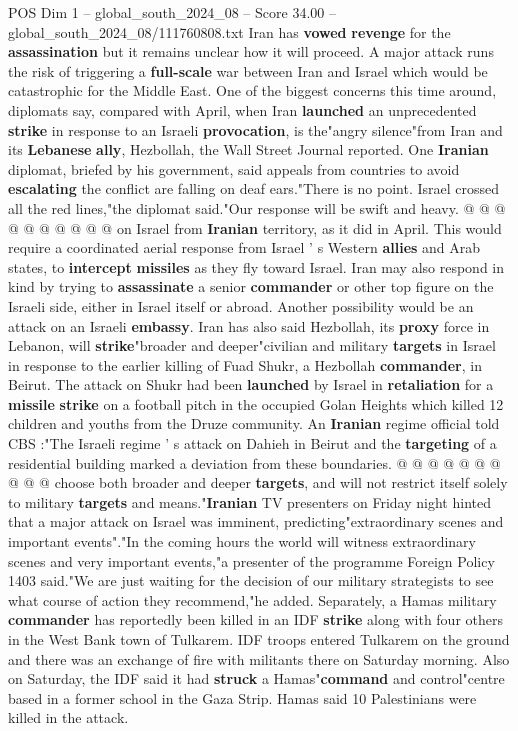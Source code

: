 \begin{textsample}{POS Dim 1 – global\_south\_2024\_08 – Score 34.00 – global\_south\_2024\_08/111760808.txt}
Iran has \textbf{vowed} \textbf{revenge} for the \textbf{assassination} but it remains unclear how it will proceed.
A major attack runs the risk of triggering a \textbf{full-scale} war between Iran and Israel which would be catastrophic for the Middle East.
One of the biggest concerns this time around, diplomats say, compared with April, when Iran \textbf{launched} an unprecedented \textbf{strike} in response to an Israeli \textbf{provocation}, is the"angry silence"from Iran and its \textbf{Lebanese} \textbf{ally}, Hezbollah, the Wall Street Journal reported.
One \textbf{Iranian} diplomat, briefed by his government, said appeals from countries to avoid \textbf{escalating} the conflict are falling on deaf ears."There is no point.
Israel crossed all the red lines,"the diplomat said."Our response will be swift and heavy. @ @ @ @ @ @ @ @ @ @ on Israel from \textbf{Iranian} territory, as it did in April.
This would require a coordinated aerial response from Israel ' s Western \textbf{allies} and Arab states, to \textbf{intercept} \textbf{missiles} as they fly toward Israel.
Iran may also respond in kind by trying to \textbf{assassinate} a senior \textbf{commander} or other top figure on the Israeli side, either in Israel itself or abroad.
Another possibility would be an attack on an Israeli \textbf{embassy}.
Iran has also said Hezbollah, its \textbf{proxy} force in Lebanon, will \textbf{strike}"broader and deeper"civilian and military \textbf{targets} in Israel in response to the earlier killing of Fuad Shukr, a Hezbollah \textbf{commander}, in Beirut.
The attack on Shukr had been \textbf{launched} by Israel in \textbf{retaliation} for a \textbf{missile} \textbf{strike} on a football pitch in the occupied Golan Heights which killed 12 children and youths from the Druze community.
An \textbf{Iranian} regime official told CBS :"The Israeli regime ' s attack on Dahieh in Beirut and the \textbf{targeting} of a residential building marked a deviation from these boundaries. @ @ @ @ @ @ @ @ @ @ choose both broader and deeper \textbf{targets}, and will not restrict itself solely to military \textbf{targets} and means."\textbf{Iranian} TV presenters on Friday night hinted that a major attack on Israel was imminent, predicting"extraordinary scenes and important events"."In the coming hours the world will witness extraordinary scenes and very important events,"a presenter of the programme Foreign Policy 1403 said."We are just waiting for the decision of our military strategists to see what course of action they recommend,"he added.
Separately, a Hamas military \textbf{commander} has reportedly been killed in an IDF \textbf{strike} along with four others in the West Bank town of Tulkarem.
IDF troops entered Tulkarem on the ground and there was an exchange of fire with militants there on Saturday morning.
Also on Saturday, the IDF said it had \textbf{struck} a Hamas"\textbf{command} and control"centre based in a former school in the Gaza Strip.
Hamas said 10 Palestinians were killed in the attack.


\end{textsample}
